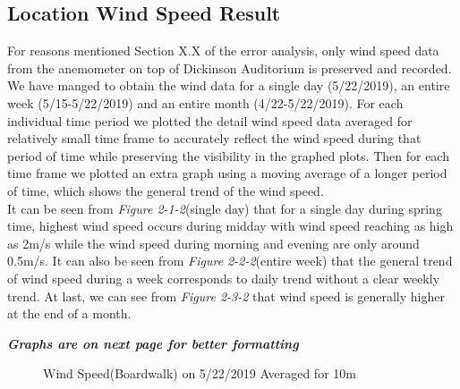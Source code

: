 \documentclass[review]{elsarticle}
\begin{document}
\clearpage
\subsection{Location Wind Speed Result}
For reasons mentioned Section X.X of the error analysis, only wind speed data from the anemometer on top of Dickinson Auditorium is preserved and recorded. We have manged to obtain 
the wind data for a single day (5/22/2019), an entire week (5/15-5/22/2019) and an entire month (4/22-5/22/2019). For each individual time period we plotted the detail wind speed data 
averaged for relatively small time frame to accurately reflect the wind speed during that period of time while preserving the visibility in the graphed plots. Then for each time frame 
we plotted an extra graph using a moving average of a longer period of time, which shows the general trend of the wind speed.
\\\indent It can be seen from \textit{Figure 2-1-2}(single day) that for a single day during spring time, highest wind speed occurs during midday with wind speed reaching as high as 2m/s while the wind 
speed during morning and evening are only around 0.5m/s. It can also be seen from \textit{Figure 2-2-2}(entire week) that the general trend of wind speed during a week corresponds to daily trend without 
a clear weekly trend. At last, we can see from \textit{Figure 2-3-2} that wind speed is generally higher at the end of a month.


\vspace{100pt}
\textit{\textbf{Graphs are on next page for better formatting}}

\clearpage


\begin{figure}
    \caption{Wind Speed(Boardwalk) on 5/22/2019 Averaged for 10m}
    \label{wind:oneday:tenminutes}
\end{figure}
\end{document}
